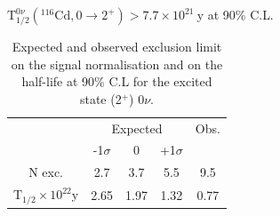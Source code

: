 \documentclass[main.tex]{subfiles}
\begin{document}
\begin{center}
$ \text{T}_{\text{1/2}}^{\text{0}\nu} (^{\text{116}} \text{Cd}, \text{0} \rightarrow \text{2}^{+}) > \text{7.7} \times \text{10}^{\text{21}}~\text{y}$ at 90\% C.L.
\end{center}


\begin{table}
\centering
\begin{tabular}{c|c|c|c||c}
 & \multicolumn{3}{c||}{Expected} & Obs. \\
                                                & -1$\sigma$ & 0        & +1$\sigma$ &         \\[0.2cm]
\hline
N exc.                                          & 2.7        & 3.7      & 5.5        & 9.5      \\[0.2cm]
T$_{\text{1/2}} \times \text{10}^{\text{22}}$y  & 2.65       & 1.97     & 1.32       & 0.77      \\[0.2cm]
\hline
\end{tabular}
\caption{Expected and observed exclusion limit on the signal normalisation and on the half-life at 90\% C.L for the excited state (2$^+$) 0$\nu$.}
\label{Tab:FinalResultsbb0nu2}
\end{table}
\end{document}
